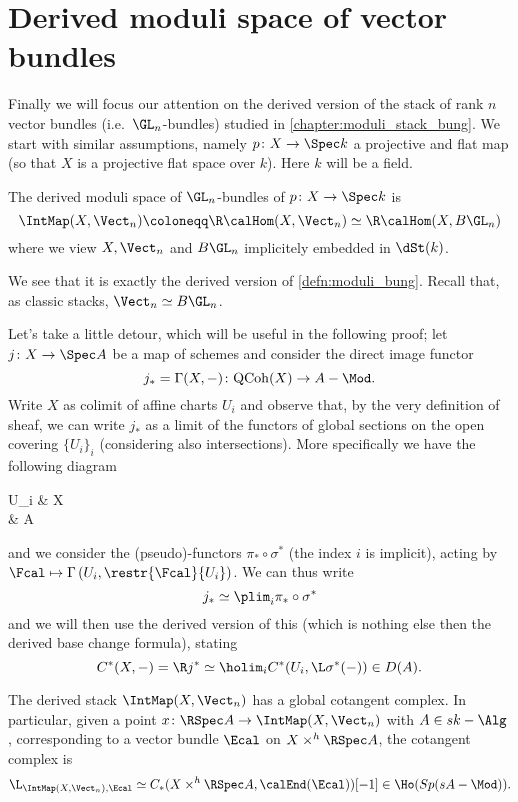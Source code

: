     \section{Derived moduli space of vector bundles}
        Finally we will focus our attention on the derived version of the stack of rank $n$ vector bundles (i.e.\ $\GL_n$-bundles) studied in \cref{chapter:moduli_stack_bung}. We start with similar assumptions, namely $p\colon X \to \Spec k$ a projective and flat map (so that $X$ is a projective flat space over $k$). Here $k$ will be a field.

        \begin{defn}
            \label{defn:rbung}
            The derived moduli space of $\GL_n$-bundles of $p\colon X \to \Spec k$ is \[\IntMap(X, \Vect_n) \coloneqq \R\calHom(X, \Vect_n) \simeq \R\calHom(X, B\GL_n) \] where we view $X, \Vect_n$ and $B\GL_n$ implicitely embedded in $\dSt(k)$. 
        \end{defn}
        We see that it is exactly the derived version of \cref{defn:moduli_bung}. Recall that, as classic stacks, $\Vect_n \simeq B\GL_n$.
        \begin{remark}
            \label{remark:limit_cohomology_complex}
            Let's take a little detour, which will be useful in the following proof; let $j\colon X \to \Spec A$ be a map of schemes and consider the direct image functor \[j_* = \Gamma(X, -)\colon \mathrm{QCoh}(X) \to A-\Mod. \] Write $X$ as colimit of affine charts $U_i$ and observe that, by the very definition of sheaf, we can write $j_*$ as a limit of the functors of global sections on the open covering $\{U_i\}_i$ (considering also intersections). More specifically we have the following diagram
            \begin{diag}
                U_i \ar[rd, "\pi"] \ar[r, "\sigma"] & X \ar[d, "j"] \\
                & \Spec A
            \end{diag}
            and we consider the (pseudo)-functors $\pi_* \circ \sigma^*$ (the index $i$ is implicit), acting by $\Fcal \mapsto \Gamma\left(U_i, \restr{\Fcal}{U_i}\right)$. We can thus write \[j_* \simeq \plim_i \pi_* \circ \sigma^* \] and we will then use the derived version of this (which is nothing else then the derived base change formula), stating \[C^*(X, -) = \R j^* \simeq \holim_i C^*(U_i, \L \sigma^*(-)) \in D(A). \]
        \end{remark}
        \begin{prop}
            \label{prop:rbung_cotangent}
            The derived stack $\IntMap(X, \Vect_n)$ has a global cotangent complex. In particular, given a point $x\colon \RSpec A \to \IntMap(X, \Vect_n)$ with $A \in sk-\Alg$, corresponding to a vector bundle $\Ecal$ on $X \times^h \RSpec A$, the cotangent complex is \[\L_{\IntMap(X, \Vect_n), \Ecal} \simeq C_*(X \times^h \RSpec A, \calEnd(\Ecal))[-1] \in \Ho(Sp(sA-\Mod)). \]
        \end{prop}
